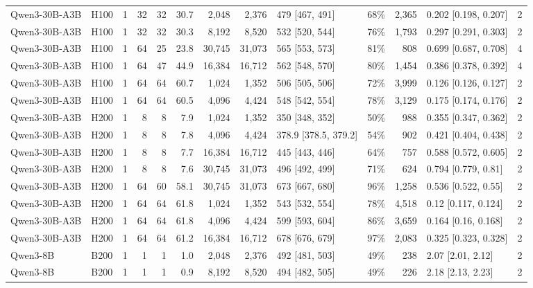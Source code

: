 \begin{landscape}
\begin{longtable}{llrrrrrrlrrlr}
Qwen3-30B-A3B & H100 & 1 & 32 & 32 & 30.7 & 2,048 & 2,376 & 479 {[}467, 491{]} & 68\% & 2,365 & 0.202 {[}0.198, 0.207{]} & 2 \\
Qwen3-30B-A3B & H100 & 1 & 32 & 32 & 30.3 & 8,192 & 8,520 & 532 {[}520, 544{]} & 76\% & 1,793 & 0.297 {[}0.291, 0.303{]} & 2 \\
Qwen3-30B-A3B & H100 & 1 & 64 & 25 & 23.8 & 30,745 & 31,073 & 565 {[}553, 573{]} & 81\% & 808 & 0.699 {[}0.687, 0.708{]} & 4 \\
Qwen3-30B-A3B & H100 & 1 & 64 & 47 & 44.9 & 16,384 & 16,712 & 562 {[}548, 570{]} & 80\% & 1,454 & 0.386 {[}0.378, 0.392{]} & 4 \\
Qwen3-30B-A3B & H100 & 1 & 64 & 64 & 60.7 & 1,024 & 1,352 & 506 {[}505, 506{]} & 72\% & 3,999 & 0.126 {[}0.126, 0.127{]} & 2 \\
Qwen3-30B-A3B & H100 & 1 & 64 & 64 & 60.5 & 4,096 & 4,424 & 548 {[}542, 554{]} & 78\% & 3,129 & 0.175 {[}0.174, 0.176{]} & 2 \\
Qwen3-30B-A3B & H200 & 1 & 8 & 8 & 7.9 & 1,024 & 1,352 & 350 {[}348, 352{]} & 50\% & 988 & 0.355 {[}0.347, 0.362{]} & 2 \\
Qwen3-30B-A3B & H200 & 1 & 8 & 8 & 7.8 & 4,096 & 4,424 & 378.9 {[}378.5, 379.2{]} & 54\% & 902 & 0.421 {[}0.404, 0.438{]} & 2 \\
Qwen3-30B-A3B & H200 & 1 & 8 & 8 & 7.7 & 16,384 & 16,712 & 445 {[}443, 446{]} & 64\% & 757 & 0.588 {[}0.572, 0.605{]} & 2 \\
Qwen3-30B-A3B & H200 & 1 & 8 & 8 & 7.6 & 30,745 & 31,073 & 496 {[}492, 499{]} & 71\% & 624 & 0.794 {[}0.779, 0.81{]} & 2 \\
Qwen3-30B-A3B & H200 & 1 & 64 & 60 & 58.1 & 30,745 & 31,073 & 673 {[}667, 680{]} & 96\% & 1,258 & 0.536 {[}0.522, 0.55{]} & 2 \\
Qwen3-30B-A3B & H200 & 1 & 64 & 64 & 61.8 & 1,024 & 1,352 & 543 {[}532, 554{]} & 78\% & 4,518 & 0.12 {[}0.117, 0.124{]} & 2 \\
Qwen3-30B-A3B & H200 & 1 & 64 & 64 & 61.8 & 4,096 & 4,424 & 599 {[}593, 604{]} & 86\% & 3,659 & 0.164 {[}0.16, 0.168{]} & 2 \\
Qwen3-30B-A3B & H200 & 1 & 64 & 64 & 61.2 & 16,384 & 16,712 & 678 {[}676, 679{]} & 97\% & 2,083 & 0.325 {[}0.323, 0.328{]} & 2 \\
Qwen3-8B & B200 & 1 & 1 & 1 & 1.0 & 2,048 & 2,376 & 492 {[}481, 503{]} & 49\% & 238 & 2.07 {[}2.01, 2.12{]} & 2 \\
Qwen3-8B & B200 & 1 & 1 & 1 & 0.9 & 8,192 & 8,520 & 494 {[}482, 505{]} & 49\% & 226 & 2.18 {[}2.13, 2.23{]} & 2 \\

\end{longtable}
\end{landscape}
